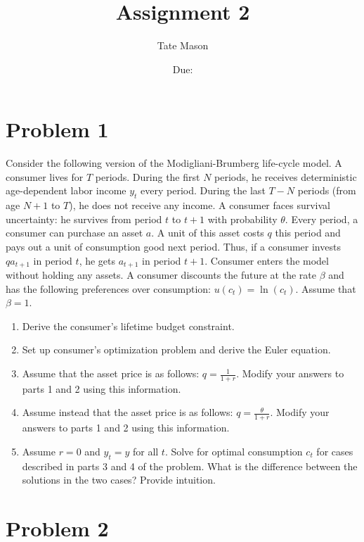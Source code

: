 \documentclass[10pt,a4paper]{article}
\begin{document}
\title{Assignment 2}
\author{Tate Mason}
\date{Due: }
\maketitle

\section*{Problem 1}

Consider the following version of the Modigliani-Brumberg life-cycle model. A consumer lives for $T$ periods. During the first $N$ periods, he receives deterministic age-dependent labor income $y_t$ every period. During the last $T-N$ periods (from age $N+1$ to $T$), he does not receive any income. A consumer faces survival uncertainty: he survives from period $t$ to $t+1$ with probability $\theta$. Every period, a consumer can purchase an asset $a$. A unit of this asset costs $q$ this period and pays out a unit of consumption good next period. Thus, if a consumer invests $q a_{t+1}$ in period $t$, he gets $a_{t+1}$ in period $t+1$. Consumer enters the model without holding any assets. A consumer discounts the future at the rate $\beta$ and has the following preferences over consumption: $u(c_t) = \ln(c_t)$. Assume that $\beta = 1$.

\begin{enumerate}
    \item Derive the consumer’s lifetime budget constraint.
    \item Set up consumer’s optimization problem and derive the Euler equation.
    \item Assume that the asset price is as follows: $q = \frac{1}{1 + r}$. Modify your answers to parts 1 and 2 using this information.
    \item Assume instead that the asset price is as follows: $q = \frac{\theta}{1 + r}$. Modify your answers to parts 1 and 2 using this information.
    \item Assume $r = 0$ and $y_t = y$ for all $t$. Solve for optimal consumption $c_t$ for cases described in parts 3 and 4 of the problem. What is the difference between the solutions in the two cases? Provide intuition.
\end{enumerate}

\section*{Problem 2}
\end{document}
